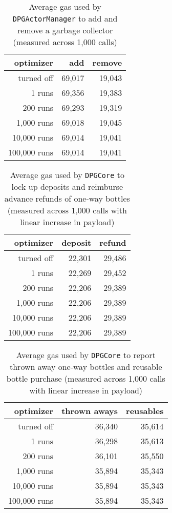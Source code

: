 \begin{appendices}
\begin{table}[hbt]
	\centering	
	\begin{tabular}{r|r|r}
    	optimizer & add & remove \\
    	\hline
    	turned off & 69,017 & 19,043 \\
    	1 runs & 69,356 & 19,383 \\ 
    	200 runs & 69,293 & 19,319 \\
    	1,000 runs & 69,018 & 19,045 \\ 
    	10,000 runs & 69,014 & 19,041 \\
    	100,000 runs & 69,014 & 19,041 \\
	\end{tabular}
	\caption[Average gas used to add and remove a garbage collector]{Average gas used by \texttt{DPGActorManager} to add and remove a garbage collector (measured across 1,000 calls)}
	\label{tab:collectorGas}
\end{table}

\begin{table}[hbt]
	\centering	
	\begin{tabular}{r|r|r}
    	optimizer & deposit & refund \\
    	\hline
    	turned off & 22,301 & 29,486 \\
    	1 runs & 22,269 & 29,452 \\ 
    	200 runs & 22,206 & 29,389 \\
    	1,000 runs & 22,206 & 29,389 \\ 
    	10,000 runs & 22,206 & 29,389 \\
    	100,000 runs & 22,206 & 29,389 \\
	\end{tabular}
	\caption[Average gas used to lock up deposits and reimburse advance refunds of one-way bottles]{Average gas used by \texttt{DPGCore} to lock up deposits and reimburse advance refunds of one-way bottles (measured across 1,000 calls with linear increase in payload)}
	\label{tab:depositRefundGas}
\end{table}

\begin{table}[hbt]
	\centering	
	\begin{tabular}{r|r|r}
    	optimizer & thrown aways & reusables \\
    	\hline
    	turned off & 36,340 & 35,614 \\
    	1 runs & 36,298 & 35,613 \\ 
    	200 runs & 36,101 & 35,550 \\
    	1,000 runs & 35,894 & 35,343 \\ 
    	10,000 runs & 35,894 & 35,343 \\
    	100,000 runs & 35,894 & 35,343 \\
	\end{tabular}
	\caption[Average gas used to report thrown away one-way bottles and reusable bottle purchases]{Average gas used by \texttt{DPGCore} to report thrown away one-way bottles and reusable bottle purchase (measured across 1,000 calls with linear increase in payload)}
	\label{tab:reportGas}
\end{table}


\end{appendices}
